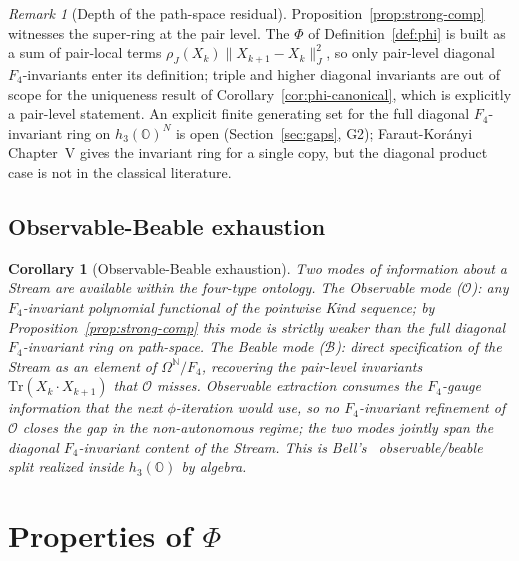 \documentclass[12pt]{article}
\newtheorem{corollary}[theorem]{Corollary}
\theoremstyle{remark}
\newtheorem{remark}[theorem]{Remark}
\newcommand{\hthree}{h_3(\mathbb{O})}
\newcommand{\Ffour}{F_4}
\newcommand{\rhoJ}{\rho_J}
\newcommand{\Phiexp}{\Phi}
\newcommand{\Tr}{\mathrm{Tr}}
\newcommand{\Jnorm}[1]{\lVert #1 \rVert_J}
\begin{document}
\begin{remark}[Depth of the path-space residual]\label{rem:path-space-depth}
Proposition~\ref{prop:strong-comp} witnesses the super-ring at the
pair level. The $\Phiexp$ of
Definition~\ref{def:phi} is built as a sum of pair-local terms
$\rhoJ(X_k) \Jnorm{X_{k+1} - X_k}^2$, so only pair-level diagonal
$\Ffour$-invariants enter its definition; triple and higher
diagonal invariants are out of scope for the uniqueness result of
Corollary~\ref{cor:phi-canonical}, which is explicitly a pair-level
statement. An explicit finite generating set for the full diagonal
$\Ffour$-invariant ring on $\hthree^N$ is open
(Section~\ref{sec:gaps}, G2); Faraut-Kor\'anyi Chapter~V gives the
invariant ring for a single copy, but the diagonal product case is
not in the classical literature.
\end{remark}

\subsection{Observable-Beable exhaustion}
\label{sec:OB1}

\begin{corollary}[Observable-Beable exhaustion]\label{cor:OB1}
Two modes of information about a Stream are available within the
four-type ontology. The \emph{Observable mode} ($\mathcal{O}$):
any $\Ffour$-invariant polynomial functional of the pointwise Kind
sequence; by Proposition~\ref{prop:strong-comp} this mode is
strictly weaker than the full diagonal $\Ffour$-invariant ring on
path-space. The \emph{Beable mode} ($\mathcal{B}$): direct
specification of the Stream as an element of
$\Omega^{\mathbb{N}} / \Ffour$, recovering the pair-level invariants
$\Tr(X_k \cdot X_{k+1})$ that $\mathcal{O}$ misses. Observable
extraction consumes the $\Ffour$-gauge information that the next
$\phi$-iteration would use, so no $\Ffour$-invariant refinement of
$\mathcal{O}$ closes the gap in the non-autonomous regime; the two
modes jointly span the diagonal $\Ffour$-invariant content of the
Stream. This is Bell's~\cite{bell1984speakable} observable/beable
split realized inside $\hthree$ by algebra.
\end{corollary}


\section{Properties of $\Phiexp$}
\label{sec:consequences}
\end{document}
